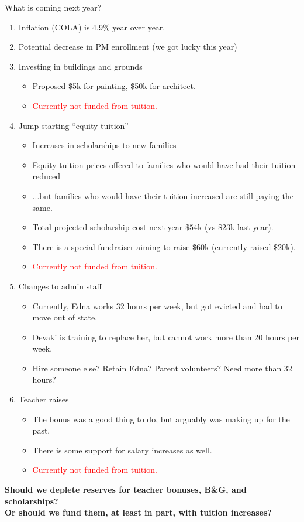 \documentclass[8pt]{beamer}
\begin{document}
\begin{frame}{What is coming next year?}

%
\begin{enumerate}
%
\item Inflation (COLA) is 4.9\% year over year.
\pause
\item Potential decrease in PM enrollment (we got lucky this year)
\pause
\item Investing in buildings and grounds
%
    \begin{itemize}
    \item Proposed \$5k for painting, \$50k for architect.
    \item \textcolor{red}{Currently not funded from tuition.}
    \end{itemize}
%
\pause
\item Jump-starting ``equity tuition''
    \begin{itemize}
    \item Increases in scholarships to new families
    \item Equity tuition prices offered to families who would have had their
    tuition reduced
    \item ...but families who would have their tuition increased are still paying
    the same.
    \item Total projected scholarship cost next year $\$54$k (vs $\$23$k last year).
    \item There is a special fundraiser aiming to raise $\$60$k (currently
    raised $\$20$k).
    \item \textcolor{red}{Currently not funded from tuition.}
    \end{itemize}
%
\item Changes to admin staff
\pause
    \begin{itemize}
        \item Currently, Edna works 32 hours per week, but got evicted and had to move out of state.
        \item Devaki is training to replace her, but cannot work more than 20 hours per week.
        \item Hire someone else?  Retain Edna?  Parent volunteers?  Need more than 32 hours?
    \end{itemize}
%
\item Teacher raises
\pause
    \begin{itemize}
        \item The bonus was a good thing to do, but arguably was making up for the past.
        \item There is some support for salary increases as well.
        \item \textcolor{red}{Currently not funded from tuition.}
    \end{itemize}
\end{enumerate}
%
\pause
\textbf{Should we deplete reserves for teacher bonuses, B\&G, and scholarships?}\\
\textbf{Or should we fund them, at least in part, with tuition increases?}

\end{frame}
\end{document}
